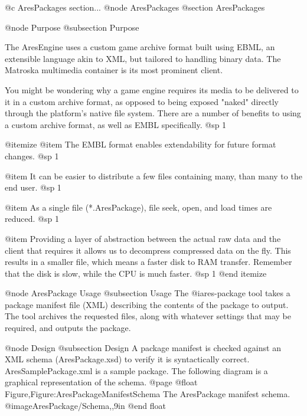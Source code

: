 @c AresPackages section...
@node AresPackages
@section AresPackages

@node Purpose
@subsection Purpose

The AresEngine uses a custom game archive format built using EBML, an extensible language akin to XML, but tailored to handling binary data. The Matroska multimedia container is its most prominent client.

You might be wondering why a game engine requires its media to be delivered to it in a custom archive format, as opposed to being exposed "naked" directly through the platform's native file system. There are a number of benefits to using a custom archive format, as well as EMBL specifically.
@sp 1

@itemize
@item
The EMBL format enables extendability for future format changes.
@sp 1

@item
It can be easier to distribute a few files containing many, than many to the end user.
@sp 1

@item
As a single file (*.AresPackage), file seek, open, and load times are reduced.
@sp 1

@item
Providing a layer of abstraction between the actual raw data and the client that requires it allows us to decompress compressed data on the fly. This results in a smaller file, which means a faster disk to RAM transfer. Remember that the disk is slow, while the CPU is much faster.
@sp 1
@end itemize

@node AresPackage Usage
@subsection Usage
The @i{ares-package} tool takes a package manifest file (XML) describing the contents of the package to output. The tool archives the requested files, along with whatever settings that may be required, and outputs the package.

@node Design
@subsection Design
A package manifest is checked against an XML schema (AresPackage.xsd) to verify it is syntactically correct. AresSamplePackage.xml is a sample package. The following diagram is a graphical representation of the schema.
@page
@float Figure,Figure:AresPackageManifestSchema
The AresPackage manifest schema.
@image{AresPackage/Schema,,9in}
@end float

